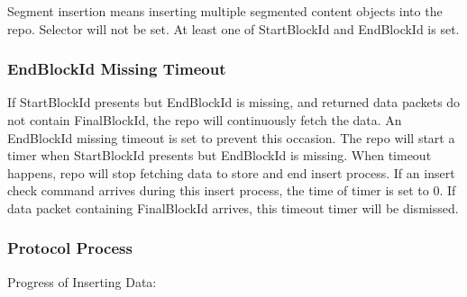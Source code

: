\documentclass{acm_proc_article-sp}
\begin{document}
Segment insertion means inserting multiple segmented content objects into the repo. Selector will not be set. At least one of StartBlockId and EndBlockId is set.

\subsubsection{EndBlockId Missing Timeout}
If StartBlockId presents but EndBlockId is missing, and returned data packets do not contain FinalBlockId, the repo will continuously fetch the data. An EndBlockId missing timeout is set to prevent this occasion. The repo will start a timer when StartBlockId presents but EndBlockId is missing. When timeout happens, repo will stop fetching data to store and end insert process. If an insert check command arrives during this insert process, the time of timer is set to 0. If data packet containing FinalBlockId arrives, this timeout timer will be dismissed.

\subsubsection{Protocol Process}

Progress of Inserting Data:
\end{document}
